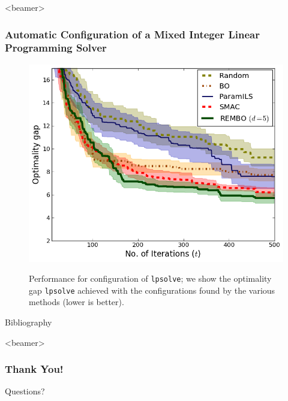 \documentclass[grey]{beamer}
\begin{document}
 \begin{frame}<beamer>
 \frametitle{Automatic Configuration of a Mixed Integer
Linear Programming Solver}
  \begin{figure}[h!]
   \begin{center}
     \includegraphics[scale=0.35]{../paper/figures/lpsolve.png}\\
     \caption{Performance for configuration of \texttt{lpsolve}; we show the optimality gap \texttt{lpsolve} achieved with the configurations found by the various methods (lower is better). 
           }
   \label{fig:lpsolve}
   \end{center}
   \vspace*{-3mm}
  \end{figure}
 \end{frame}

 \begin{frame}{Bibliography}
  \tiny
  
  
 \end{frame}
 
 \begin{frame}<beamer>
 \frametitle{Thank You!}
  \begin{center}
  \huge
    Questions?
  \end{center}
 \end{frame}
 
 

 
\end{document}
